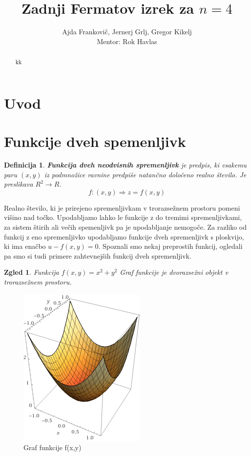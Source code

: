 \documentclass[12pt, a4paper]{article}
\title{Zadnji Fermatov izrek za $n=4$}
\author{Ajda Frankovič, Jernerj Grlj, Gregor Kikelj \\ Mentor: Rok Havlas}
\newtheorem{zgled}{Zgled}
\newtheorem{definicija}{Definicija}
\begin{document}
\begin{abstract}
kk
\end{abstract}

\section{Uvod}




\newpage
\section{Funkcije dveh spemenljivk}


\begin{definicija}
\textbf{Funkcija dveh neodvisnih spremenljivk} je predpis, ki vsakemu paru $(x,y)$ iz podmnožice ravnine predpiše natančno določeno realno število.
Je preslikava $R^2 \rightarrow R$.
$$f:(x,y) \Rightarrow z=f(x,y)$$

\end{definicija}

Realno število, ki je prirejeno spremenljivkam v trorazsežnem prostoru pomeni višino nad točko. Upodabljamo lahko le funkcije z do tremimi spremenljivkami, za sistem štirih ali večih spemenljivk pa je upodabljanje nemogoče. Za razliko od funkcij z eno spremenljivko upodabljamo funkcije dveh spremenljivk s ploskvijo, ki ima enačbo $u-f(x,y)=0$. Spoznali smo nekaj preprostih funkcij, ogledali pa smo si tudi primere zahtevnejših funkcij dveh spremenljivk.

\begin{zgled}
Funkcija $f(x,y)=x^2+y^2$ Graf funkcije je dvorazsežni objekt v trorazsežnem prostoru.
\end{zgled}

\begin{figure}[h!]
\centering
\includegraphics{slika_funkcije.PNG}
\caption{Graf funkcije f(x,y)}
\end{figure}
\end{document}
